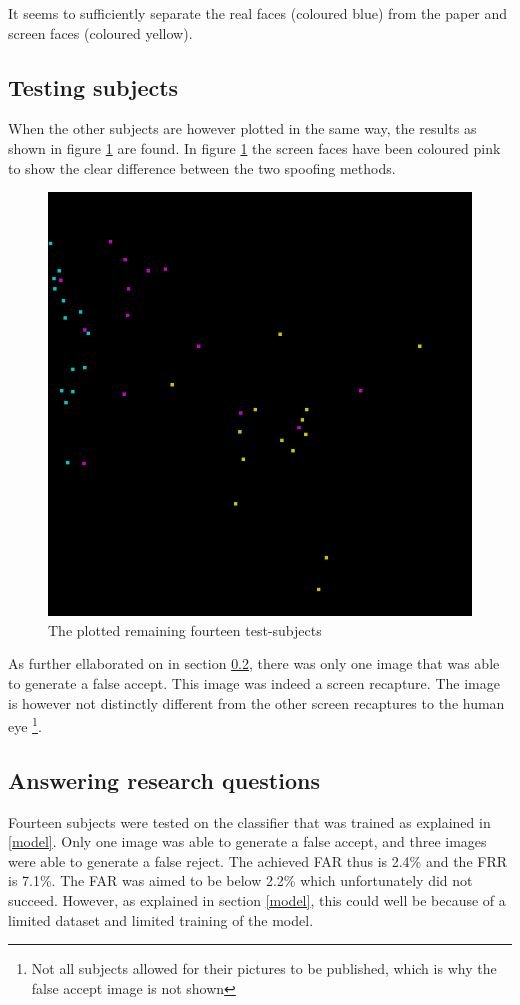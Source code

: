 \documentclass{sig-alternate-br}
\begin{document}
It seems to sufficiently separate the real faces (coloured blue) from the paper and screen faces (coloured yellow).

\subsection{Testing subjects} \label{tests}
When the other subjects are however plotted in the same way, the results as shown in figure \ref{fig:tests} are found. In figure \ref{fig:tests} the screen faces have been coloured pink to show the clear difference between the two spoofing methods.

\begin{figure}[h]
	\includegraphics[scale=0.2]{tests}
	\caption{The plotted remaining fourteen test-subjects}
	\label{fig:tests}
\end{figure}

As further ellaborated on in section \ref{stats}, there was only one image that was able to generate a false accept. This image was indeed a screen recapture. The image is however not distinctly different from the other screen recaptures to the human eye \footnote{Not all subjects allowed for their pictures to be published, which is why the false accept image is not shown}.

\subsection{Answering research questions} \label{stats}
Fourteen subjects were tested on the classifier that was trained as explained in \ref{model}. Only one image was able to generate a false accept, and three images were able to generate a false reject. The achieved FAR thus is 2.4\% and the FRR is 7.1\%. The FAR was aimed to be below 2.2\% which unfortunately did not succeed. However, as explained in section \ref{model}, this could well be because of a limited dataset and limited training of the model.
\end{document}
